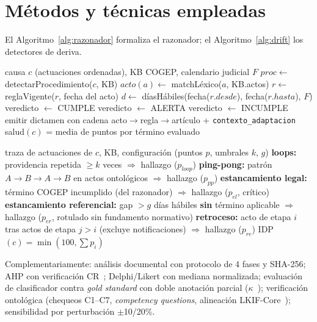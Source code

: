 \documentclass[a4paper,openany,12pt]{book}
\begin{document}
\section{Métodos y técnicas empleadas}
El Algoritmo~\ref{alg:razonador} formaliza el razonador; el Algoritmo~\ref{alg:drift} los detectores de deriva.
\begin{algorithm}[H]
\caption{Razonador simbólico de términos COGEP (cognitive digital shadow)}\label{alg:razonador}
\begin{algorithmic}[1]
\REQUIRE causa $c$ (actuaciones ordenadas), KB COGEP, calendario judicial $F$
\STATE $proc \leftarrow$ detectarProcedimiento($c$, KB) 
  \STATE $acto(a) \leftarrow$ matchLéxico($a$, KB.actos) 
\ENDFOR
{}
  \STATE $r \leftarrow$ reglaVigente($r$, fecha del acto) 
  \STATE $d \leftarrow$ díasHábiles(fecha($r.desde$), fecha($r.hasta$), $F$) 
   \STATE veredicto $\leftarrow$ CUMPLE
   \STATE veredicto $\leftarrow$ ALERTA 
  \ELSE \STATE veredicto $\leftarrow$ INCUMPLE 
  \ENDIF
  \STATE emitir dictamen con cadena acto$\to$regla$\to$artículo + \texttt{contexto\_adaptacion}
\ENDFOR
\RETURN salud$(c)$ = media de puntos por término evaluado
\end{algorithmic}
\end{algorithm}
\begin{algorithm}[H]
\caption{Detección de deriva procesal (IDP) con criterio normativo primario}\label{alg:drift}
\begin{algorithmic}[1]
\REQUIRE traza de actuaciones de $c$, KB, configuración (puntos $p$, umbrales $k$, $g$)
\STATE \textbf{loops:} providencia repetida $\ge k$ veces $\Rightarrow$ hallazgo ($p_{loop}$)
\STATE \textbf{ping-pong:} patrón $A{\to}B{\to}A{\to}B$ en actos ontológicos $\Rightarrow$ hallazgo ($p_{pp}$)
\STATE \textbf{estancamiento legal:} término COGEP incumplido (del razonador) $\Rightarrow$ hallazgo ($p_{el}$, crítico)
\STATE \textbf{estancamiento referencial:} gap $> g$ días hábiles \textbf{sin} término aplicable $\Rightarrow$ hallazgo ($p_{er}$, rotulado sin fundamento normativo)
\STATE \textbf{retroceso:} acto de etapa $i$ tras actos de etapa $j>i$ (excluye notificaciones) $\Rightarrow$ hallazgo ($p_{re}$)
\RETURN IDP$(c) = \min(100, \sum p_i)$
\end{algorithmic}
\end{algorithm}
Complementariamente: análisis documental con protocolo de 4 fases y SHA-256; AHP con verificación CR~\cite{saaty1990}; Delphi/Likert con mediana normalizada; evaluación de clasificador contra \textit{gold standard} con doble anotación parcial ($\kappa$~\cite{cohen1960}); verificación ontológica (chequeos C1--C7, \textit{competency questions}, alineación LKIF-Core~\cite{casanovas2016}); sensibilidad por perturbación $\pm$10/20\%.
\end{document}
